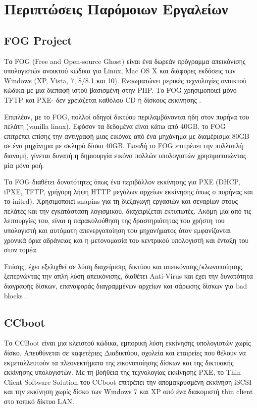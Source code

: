 \section{Περιπτώσεις Παρόμοιων Εργαλείων}
\subsection{FOG Project}
Το FOG (Free and Open-source Ghost) είναι ένα δωρεάν πρόγραμμα απεικόνισης υπολογιστών ανοικτού κώδικα για Linux, Mac OS X και διάφορες εκδόσεις των Windows (XP, Vista, 7, 8/8.1 και 10). Ενσωματώνει μερικές τεχνολογίες ανοικτού κώδικα με μια διεπαφή ιστού βασισμένη στην PHP. Το FOG χρησιμοποιεί μόνο TFTP και PXE- δεν χρειάζεται καθόλου CD ή δίσκους εκκίνησης \cite{FOG_Project_2020}. 

Επιπλέον, με το FOG, πολλοί οδηγοί δικτύου περιλαμβάνονται ήδη στον πυρήνα του πελάτη (vanilla linux). Εφόσον τα δεδομένα είναι κάτω από 40GB, το FOG επιτρέπει επίσης την αντιγραφή μιας εικόνας από ένα μηχάνημα με διαμέρισμα 80GB σε ένα μηχάνημα με σκληρό δίσκο 40GB. Επειδή το FOG επιτρέπει την πολλαπλή διανομή, γίνεται δυνατή η δημιουργία εικόνα πολλών υπολογιστών χρησιμοποιώντας μία μόνο ροή. 

Το FOG  διαθέτει δυνατότητες  όπως ένα περιβάλλον εκκίνησης για PXE (DHCP, iPXE, TFTP, γρήγορη λήψη HTTP μεγάλων αρχείων εκκίνησης όπως ο πυρήνας και το initrd). Χρησιμοποιεί snapins για τη διεξαγωγή εργασιών και σεναρίων στους πελάτες και την εγκατάσταση λογισμικού, διαχειρίζεται εκτυπωτές. 
Ακόμη μία από τις λειτουργίες του, είναι η παρακολούθηση της δραστηριότητας του χρήστη του υπολογιστή και αυτόματη απενεργοποίηση του μηχανήματος όταν εμφανίζονται χρονικά όρια αδράνειας και η μετονομασία του κεντρικού υπολογιστή και ένταξη του στον τομέα.

Επίσης, έχει εξελιχθεί σε λύση διαχείρισης δικτύου και απεικόνισης/κλωνοποίησης, ξεπερνώντας την απλή λύση απεικόνισης, διαθέτει Anti-Virus και έχει την δυνατότητα διαγραφής δίσκων, επαναφοράς διαγραμμένων αρχείων και σάρωσης δίσκων για bad blocks \cite{FOG_2020}.

\subsection{CCboot}
Το CCBoot είναι μια κλειστού κώδικα, εμπορική λύση εκκίνησης υπολογιστών χωρίς δίσκο. Aπευθύνεται σε καφετέριες Διαδικτύου, σχολεία και εταιρείες που θέλουν να εκμεταλλευτούν τα πλεονεκτήματα της εικονοποίησης δίσκων και της δικτυακής εκκίνησης υπολογιστών. Με τη βοήθεια της τεχνολογίας εκκίνησης PXE, το Thin Client Software Solution του CCboot επιτρέπει την απομακρυσμένη εκκίνηση iSCSI και την εκκίνηση χωρίς δίσκο των Windows 7 και XP από ένα διακομιστή thin client στο τοπικό δίκτυο LAN.

